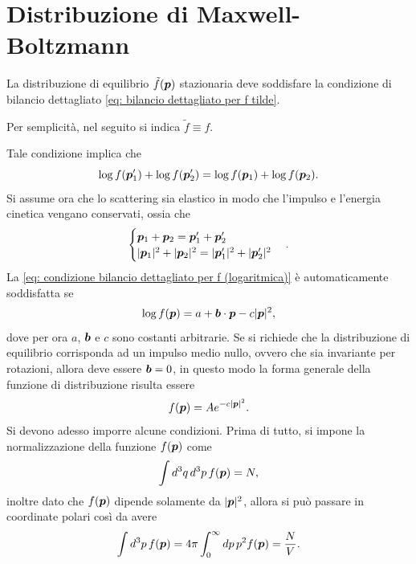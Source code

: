 \section{Distribuzione di Maxwell-Boltzmann}
La distribuzione di equilibrio $\tilde{f}(\bm{p})$ stazionaria deve soddisfare la condizione di bilancio dettagliato \eqref{eq: bilancio dettagliato per f tilde}. 
\begin{notz}
    Per semplicità, nel seguito si indica $\tilde{f} \equiv f$.
\end{notz}
Tale condizione implica che 
\begin{equation}
\label{eq: condizione bilancio dettagliato per f (logaritmica)}
    \log{f(\bm{p}_1')} + \log{f(\bm{p}_2')} = \log{f(\bm{p}_1)} + \log{f(\bm{p}_2)}.
\end{equation}
Si assume ora che lo scattering sia elastico in modo che l'impulso e l'energia cinetica vengano conservati, ossia che
\begin{equation}
    \begin{cases}
        \bm{p}_1 + \bm{p}_2 = \bm{p}_1' + \bm{p}_2' \\
        |\bm{p}_1|^2 + |\bm{p}_2|^2 = |\bm{p}_1'|^2 + |\bm{p}_2'|^2
    \end{cases}.
\end{equation}
La \eqref{eq: condizione bilancio dettagliato per f (logaritmica)} è automaticamente soddisfatta se 
\begin{equation}
    \log{f(\bm{p})} = a + \bm{b} \cdot \bm{p} - c|\bm{p}|^2,
\end{equation}
dove per ora $a$, $\bm{b}$ e $c$ sono costanti arbitrarie. Se si richiede che la distribuzione di equilibrio corrisponda ad un impulso medio nullo, ovvero che sia invariante per rotazioni, allora deve essere $\bm{b} = 0$, in questo modo la forma generale della funzione di distribuzione risulta essere
\begin{equation}
\label{eq: forma generica distribuzione MB}
    f(\bm{p}) = Ae^{-c|\bm{p}|^2}.
\end{equation}
Si devono adesso imporre alcune condizioni. Prima di tutto, si impone la normalizzazione della funzione $f(\bm{p})$ come
\begin{equation}
\label{eq: normalizzazione f tilde}
    \int d^3q\,d^3p\,f(\bm{p}) = N,
\end{equation}
inoltre dato che $f(\bm{p})$ dipende solamente da $|\bm{p}|^2$, allora si può passare in coordinate polari così da avere
\begin{equation}
    \int d^3p\,f(\bm{p}) = 4\pi\int_0^\infty dp\,p^2f(\bm{p}) = \frac{N}{V}.
\end{equation}
